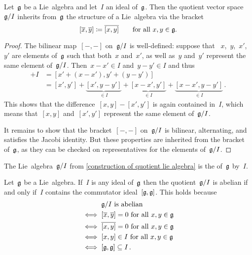 \begin{proposition}
  \label{construction of quotient lie algebra}
  Let~$\mathfrak{g}$ be a Lie~algebra and let~$I$ an ideal of~$\mathfrak{g}$.
  Then the quotient vector space~$\mathfrak{g}/I$ inherits from~$\mathfrak{g}$ the structure of a Lie~algebra via the bracket
  \[
    [\overline{x}, \overline{y}]
    \coloneqq
    \overline{ [x,y] }
    \qquad
    \text{for all~$x, y \in \mathfrak{g}$.}
  \]
\end{proposition}


\begin{proof}
  The bilinear map~$[-,-]$ on~$\mathfrak{g}/I$ is well-defined:
  suppose that ~$x$,~$y$,~$x'$,~$y'$ are elements of~$\mathfrak{g}$ such that both~$x$ and~$x'$, as well as~$y$ and~$y'$ represent the same element of~$\mathfrak{g} / I$.
  Then~$x - x' \in I$ and~$y - y' \in I$ and thus
  \begin{align*}
    [x,y] + I
    &=
    [x' + (x-x'), y' + (y-y')]
    \\
    &=
    [x',y']
    + \underbrace{[x', y-y']}_{\in I}
    + \underbrace{[x-x', y']}_{\in I}
    + \underbrace{[x-x', y-y']}_{\in I} \,.
  \end{align*}
  This shows that the difference~$[x, y] - [x', y']$ is again contained in~$I$, which means that~$[x, y]$ and~$[x', y']$ represent the same element of~$\mathfrak{g} / I$.
  
  It remains to show that the bracket~$[-,-]$ on~$\mathfrak{g} / I$ is bilinear, alternating, and satisfies the Jacobi identity.
  But these properties are inherited from the bracket of~$\mathfrak{g}$, as they can be checked on representatives for the elements of~$\mathfrak{g} / I$.
\end{proof}


\begin{definition}
  The Lie~algebra~$\mathfrak{g} / I$ from \cref{construction of quotient lie algebra} is the  of~$\mathfrak{g}$ by~$I$.
\end{definition}


\begin{example}
  Let~$\mathfrak{g}$ be a Lie~algebra.
  If~$I$ is any ideal of~$\mathfrak{g}$ then the quotient~$\mathfrak{g} / I$ is abelian if and only if~$I$ contains the commutator ideal~$[\mathfrak{g}, \mathfrak{g}]$.
  This holds because
  \begin{align*}
    {}&
    \text{$\mathfrak{g} / I$ is abelian}
    \\
    \iff{}&
    \text{$[ \overline{x}, \overline{y}] = 0$ for all~$x, y \in \mathfrak{g}$}
    \\
    \iff{}&
    \text{$\overline{[x,y]} = 0$ for all~$x, y \in \mathfrak{g}$}
    \\
    \iff{}&
    \text{$[x,y] \in I$ for all~$x, y \in \mathfrak{g}$}
    \\
    \iff{}&
    [\mathfrak{g}, \mathfrak{g}] \subseteq I \,.
  \end{align*}
\end{example}


